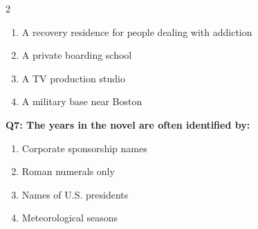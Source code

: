 \documentclass[10pt]{article}
\begin{document}
\begin{multicols}{2}
\begin{enumerate}[label=\arabic*.]
\item A recovery residence for people dealing with addiction
\item A private boarding school
\item A TV production studio
\item A military base near Boston
\end{enumerate}
\textbf{Q7: The years in the novel are often identified by:}

\begin{enumerate}[label=\arabic*.]
\item Corporate sponsorship names
\item Roman numerals only
\item Names of U.S. presidents
\item Meteorological seasons
\end{enumerate}
\end{multicols}

\newpage
\end{document}
